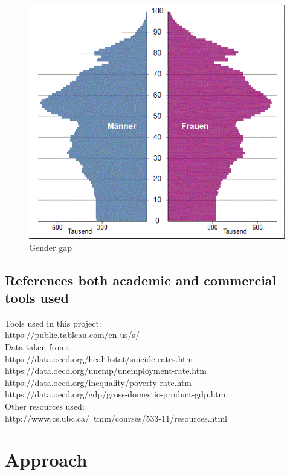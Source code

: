 \documentclass{vgtc}                          %
\begin{document}
\begin{figure}[tb]
\centering
\includegraphics[width=\columnwidth]{image/roman/malefemale.png}
\caption{Gender gap}
\label{fig:malefemale} 
\end{figure}

\subsection{References both academic and commercial tools used}

Tools used in this project: \\
https://public.tableau.com/en-us/s/ \\
Data taken from: \\
https://data.oecd.org/healthstat/suicide-rates.htm \\
https://data.oecd.org/unemp/unemployment-rate.htm \\
https://data.oecd.org/inequality/poverty-rate.htm \\
https://data.oecd.org/gdp/gross-domestic-product-gdp.htm \\
Other resources used: \\
http://www.cs.ubc.ca/~tmm/courses/533-11/resources.html \\

\section{Approach}
\end{document}
